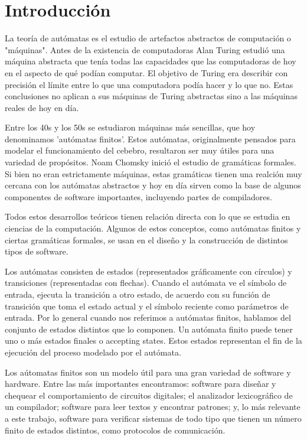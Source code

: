\section{Introducción}
La teoría de autómatas es el estudio de artefactos abstractos de computación o "máquinas". Antes de la existencia de computadoras Alan Turing estudió una máquina abstracta que tenía todas las capacidades que las computadoras de hoy en el aspecto de qué podían computar. El objetivo de Turing era describir con precisión el límite entre lo que una computadora podía hacer y lo que no. Estas conclusiones no aplican a sus máquinas de Turing abstractas sino a las máquinas reales de hoy en día.

Entre los 40s y los 50s se estudiaron máquinas más sencillas, que hoy denominamos 'autómatas finitos'. Estos autómatas, originalmente pensados para modelar el funcionamiento del cebebro, resultaron ser muy útiles para una variedad de propósitos. Noam Chomsky inició el estudio de gramáticas formales. Si bien no eran estrictamente máquinas, estas gramáticas tienen una realción muy cercana con los autómatas abstractos y hoy en día sirven como la base de algunos componentes de software importantes, incluyendo partes de compiladores.

Todos estos desarrollos teóricos tienen relación directa con lo que se estudia en ciencias de la computación. Algunos de estos conceptos, como autómatas finitos y ciertas gramáticas formales, se usan en el diseño y la construcción de distintos tipos de software.

Los autómatas consisten de estados (representados gráficamente con círculos) y transiciones (representadas con flechas). Cuando el autómata ve el símbolo de entrada, ejecuta la transición a otro estado, de acuerdo con su función de transición que toma el estado actual y el símbolo reciente como parámetros de entrada. Por lo general cuando nos referimos a autómatas finitos, hablamos del conjunto de estados distintos que lo componen. Un autómata finito puede tener uno o más estados finales o accepting states. Estos estados representan el fin de la ejecución del proceso modelado por el autómata.

Los aútomatas finitos son un modelo útil para una gran variedad de software y hardware. Entre las más importantes encontramos: software para diseñar y chequear el comportamiento de circuitos digitales; el analizador lexicográfico de un compilador; software para leer textos y encontrar patrones; y, lo más relevante a este trabajo, software para verificar sistemas de todo tipo que tienen un número finito de estados distintos, como protocolos de comunicación.


